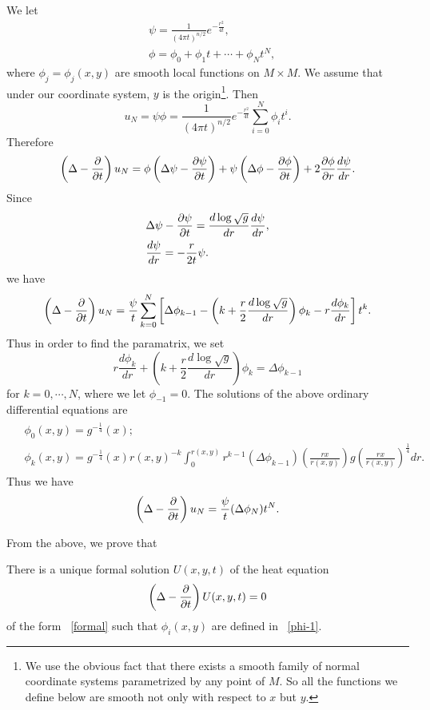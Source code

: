We let
\begin{align*}
& \psi=\frac{1}{(4\pi t)^{n/2}}e^{-\frac{r^2}{4t}},\\
&\phi=\phi_0+\phi_1 t+\cdots+\phi_Nt^N,
\end{align*}
where $\phi_j=\phi_j(x,y)$ are smooth local  functions on $M\times M$. We assume that under our coordinate system, $y$ is the origin\footnote{We use the obvious fact that there exists a smooth family of normal coordinate systems parametrized by any point of $M$. So all the functions we define below are smooth not only with respect to $x$ but $y$.}. Then
\[
u_N=\psi\phi=\frac{1}{(4\pi t)^{n/2}}e^{-\frac{r^2}{4t}}
\sum_{i=0}^N\phi_i t^i.
\]
Therefore
\[
\left(\Delta-\frac{\partial}{\partial t}\right) u_N=\phi\left(\Delta\psi-\frac{\partial\psi}{\partial t}\right)+\psi\left(\Delta\phi-\frac{\partial\phi}{\partial t}\right)+2\frac{\partial\phi}{\partial r}\frac{d\psi}{dr}.
\]
Since 
\begin{align*}
&\Delta\psi-\frac{\partial\psi}{\partial t}=\frac{d\log\sqrt g}{dr}\frac{d\psi}{dr},\\
&\frac{d\psi}{dr}=-\frac{r}{2t}\psi.
\end{align*}
we have
\begin{equation}\label{17}
\left(\Delta-\frac{\partial}{\partial t}\right)u_N=\frac{\psi}{t}\sum_{k=0}^N\left[
\Delta\phi_{k-1}-\left(k+\frac r2\frac{d\log\sqrt g}{dr}\right)\phi_k-r\frac{d\phi_k}{dr}\right] t^k.
\end{equation}
Thus in order to find the paramatrix, we set
\[
r\frac{d\phi_k}{dr}+\left(k+\frac r2\frac{d\log\sqrt g}{dr}\right)\phi_k=\Delta\phi_{k-1}
\]
for $k=0,\cdots,N$, where we let $\phi_{-1}=0$. The solutions of the above ordinary differential equations are
\begin{align}\label{phi-1}
\begin{split}
& \phi_0(x,y)=g^{-\frac 14}(x);\\
&\phi_k(x,y)=g^{-\frac 14}(x)r(x,y)^{-k}\int_0^{r(x,y)} r^{k-1}(\Delta\phi_{k-1})\left(\frac{rx}{r(x,y)}\right) g\left(\frac{rx}{r(x,y)}\right)^{\frac 14}dr.
\end{split} 
\end{align}
Thus we have
\[
\left(\Delta-\frac{\partial}{\partial t}\right)u_N=\frac{\psi}{t}(\Delta\phi_N)t^N.
\]

From the above, we prove that
\begin{lemma}
There is a unique formal solution $U(x,y,t)$ of the heat equation
\[
\left(\Delta-\frac{\partial}{\partial t}\right)U(x,y,t)=0
\]
of the form ~\eqref{formal} such that $\phi_i(x,y)$ are defined in ~\eqref{phi-1}.
\end{lemma}

